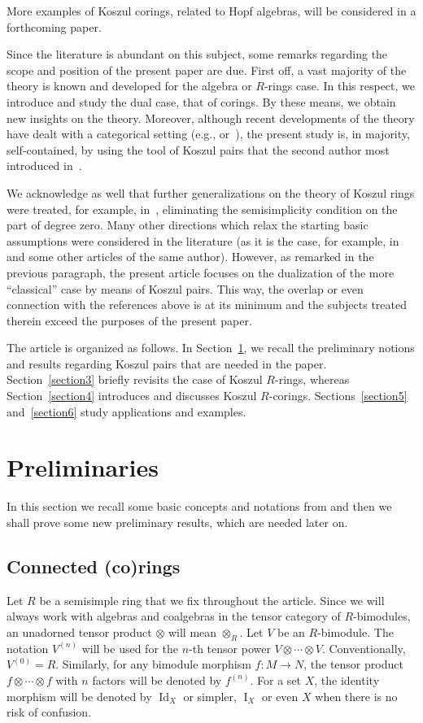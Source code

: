 \documentclass[pdftex]{sigma}
\newcommand\ot{\otimes}
\renewcommand{\^}[1]{\mbox{$^{\left( #1 \right)}$}}
\renewcommand{\_}[1]{\mbox{$_{\left( #1 \right)}$}}
\numberwithin{equation}{section}
\begin{document}
More examples of Koszul corings, related to Hopf algebras, will be considered in a forthcoming paper.

Since the literature is abundant on this subject, some remarks regarding the scope and position of the present paper are due. First of\/f, a vast majority of the theory is known and developed for the algebra or $R$-rings case. In this respect, we introduce and study the dual case, that of corings. By these means, we obtain new insights on the theory. Moreover, although recent developments of the theory have dealt with a categorical setting (e.g., \cite{ke} or~\cite{mos}), the present study is, in majority, self-contained, by using the tool of Koszul pairs that the second author most introduced in~\cite{jps}.

We acknowledge as well that further generalizations on the theory of Koszul rings were treated, for example, in~\cite{grs,md1,md2}, eliminating the semisimplicity condition on the part of degree zero. Many other directions which relax the starting basic assumptions were considered in the literature (as it is the case, for example, in~\cite{ber} and some other articles of the same author). However, as remarked in the previous paragraph, the present article focuses on the dualization of the more ``classical'' case by means of Koszul pairs. This way, the overlap or even connection with the references above is at its minimum and the subjects treated therein exceed the purposes of the present paper.

The article is organized as follows. In Section~\ref{section2}, we recall the preliminary notions and results regarding Koszul pairs that are needed in the paper. Section~\ref{section3} brief\/ly revisits the case of Koszul $R$-rings, whereas Section~\ref{section4} introduces and discusses Koszul $R$-corings. Sections~\ref{section5} and~\ref{section6} study applications and examples.

\section{Preliminaries}\label{section2}
In this section we recall some basic concepts and notations from \cite{jps} and then we shall prove some new preliminary results, which are needed later on.
	
\subsection{Connected (co)rings} \label{corings} Let $R$ be a semisimple ring that we f\/ix throughout the article. Since we will always work with algebras and coalgebras in the tensor category of $R$-bimodules, an unadorned tensor product $\ot$ will mean $\ot_R$. Let $V$ be an $R$-bimodule. The notation $V^{(n)}$ will be used for the $n$-th tensor power $V \ot \cdots \ot V$. Conventionally, $V^{(0)} = R$. Similarly, for any bimodule morphism $f\colon M \to N$, the tensor product $f \ot \cdots \ot f$ with $n$ factors will be denoted by $f^{(n)}$. For a set $X$, the identity morphism will be denoted by $\operatorname{Id}_X$ or simpler, $\operatorname{I}_X$ or even $X$ when there is no risk of confusion.
\end{document}
